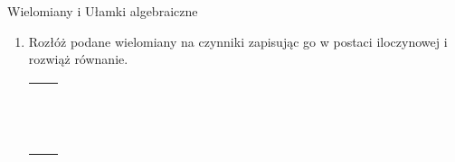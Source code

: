 \documentclass[12pt,a4paper]{article}
\begin{document}
	\begin{center}
		\LARGE Wielomiany i Ułamki algebraiczne
	\end{center}
	\vspace{1cm}
	
	
	\begin{enumerate}[1.]
		\item Rozłóż podane wielomiany na czynniki zapisując go w postaci iloczynowej i rozwiąż równanie.
		
		\begin{enumerate}[a)] \begin{tabular}{p{7cm} p{7cm}} 
				\item $4x^2-2x^4+6x^3=0 $& \vspace{0.4cm} \item $9x^2-16=0 $ \\
				\item $6x^3-12x^2+18x=0 $& \item $9x^2-30x+25=0 $ \\
				\item $x^4-10x^2+25 $& \item $7x^3+2x^2-21x-6=0 $ \\
				\item $ x^3+4x^2-2x-8=0$& \item $2x^5+3x^4-2x-3=0 $ \\
				\item $x^6-7x^3-8=0 $& \item $8x^5-32x^3-x^2+4=0 $ \\
				\item $19x^3+9x^2-18x-9=0 $& \item $x^3+4x^2+x-6=0 $ \\
				\item $x^3+7x^2+4x-12=0 $& \item $x^3-x+6=0 $ \\
				\item $x^4+3x^3-15x^2-19x+30=0 $& \item $4x^4-12x^3+25x^2-48x+36=0 $ \\
				\item $x^3+4x^2-2x-8=0 $& \item $x^3-9x^2+23x-15=0 $ \\
				\item $x^3+12x^2+44x+48=0 $& \item $x^3+9x^2+23x+15=0 $ \\
				\item $x^7-17x^6+16x^5=0 $& \item $x^8+x^4-2=0 $ \\
				\item $10x^3-3x^2-2x+1=0 $& \item $4x^3+2x^2-8x+3=0 $ \\
				\item $x^5+4x^3-x^2-4=0 $& \item $2x^6-8x^4-2x^2+8=0 $ \\
		\end{tabular} \end{enumerate}
	

\end{enumerate}
\end{document}

